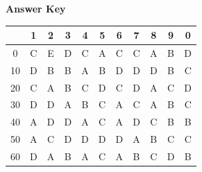 \documentclass[11pt,a4paper]{article}
\begin{document}
\textbf{Answer Key}
\begin{tabular}{ | c | c c c c c c c c c c | }
\hline
 & 1 & 2 & 3 & 4 & 5 & 6 & 7 & 8 & 9 & 0 \\
\hline
0 & C & E & D & C & A & C & C & A & B & D \\
10 & D & B & B & A & B & D & D & D & B & C \\
20 & C & A & B & C & D & C & D & A & C & D \\
30 & D & D & A & B & C & A & C & A & B & C \\
40 & A & D & D & A & C & A & D & C & B & B \\
50 & A & C & D & D & D & D & A & B & C & C \\
60 & D & A & B & A & C & A & B & C & D & B \\
\hline
\end{tabular}
\clearpage
\end{document}
